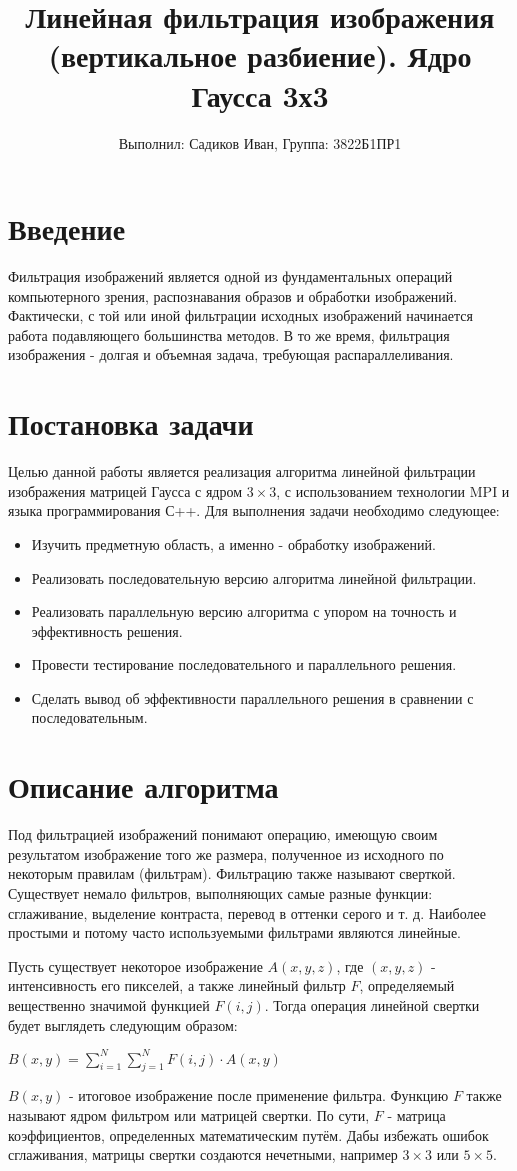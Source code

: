 \documentclass[a4paper,14pt]{report}
\title{Линейная фильтрация изображения (вертикальное разбиение). Ядро Гаусса 3х3}
\author{Выполнил: Садиков Иван, 
Группа: 3822Б1ПР1}
\begin{document}
\section{Введение}
Фильтрация изображений является одной из фундаментальных операций компьютерного зрения, распознавания образов и обработки изображений. Фактически, с той или иной фильтрации исходных изображений начинается работа подавляющего большинства методов. В то же время, фильтрация изображения - долгая и объемная задача, требующая распараллеливания.

\section{Постановка задачи}
Целью данной работы является реализация алгоритма линейной фильтрации изображения матрицей Гаусса с ядром $3 \times 3$, с использованием технологии MPI и языка программирования С++. Для выполнения задачи необходимо следующее:
\begin{itemize}
    \item Изучить предметную область, а именно - обработку изображений.
    \item Реализовать последовательную версию алгоритма линейной фильтрации.
    \item Реализовать параллельную версию алгоритма с упором на точность и эффективность решения.
    \item Провести тестирование последовательного и параллельного решения.
    \item Сделать вывод об эффективности параллельного решения в сравнении с последовательным.
\end{itemize}
\newpage
\section{Описание алгоритма}
Под фильтрацией изображений понимают операцию, имеющую своим результатом
изображение того же размера, полученное из исходного по некоторым правилам (фильтрам). Фильтрацию также называют сверткой. Существует немало фильтров, выполняющих самые разные функции: сглаживание, выделение контраста, перевод в оттенки серого и т. д. Наиболее простыми и потому часто используемыми фильтрами являются линейные.

Пусть существует некоторое изображение $A(x, y, z)$, где $(x, y, z)$ - интенсивность его пикселей, а также линейный фильтр $F$, определяемый вещественно значимой функцией $F(i, j)$. Тогда операция линейной свертки будет выглядеть следующим образом:
\begin{center}
    $B(x, y) = \sum_{i = 1}^{N}\sum_{j = 1}^{N}F(i, j) \cdot A(x, y)$
\end{center}
$B(x, y)$ - итоговое изображение после применение фильтра.
Функцию $F$ также называют ядром фильтром или матрицей свертки. По сути, $F$ - матрица коэффициентов, определенных математическим путём. Дабы избежать ошибок сглаживания, матрицы свертки создаются нечетными, например $3\times 3$ или $5\times 5$. 
\end{document}
